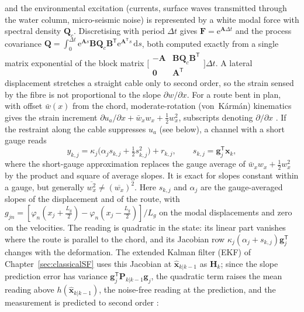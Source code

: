 and the environmental excitation (currents, surface waves transmitted through the water column, micro-seismic noise) is represented by a white modal force with spectral density $\mathbf{Q}_c$. Discretising with period $\Delta t$ gives $\mathbf{F}=\mathrm{e}^{\mathbf{A}\Delta t}$ and the process covariance $\mathbf{Q}=\int_0^{\Delta t}\mathrm{e}^{\mathbf{A}s}\mathbf{B}\mathbf{Q}_c\mathbf{B}^{\mathsf T}\mathrm{e}^{\mathbf{A}^{\mathsf T}s}\,\mathrm{d}s$, both computed exactly from a single matrix exponential of the block matrix $\bigl[\begin{smallmatrix}-\mathbf{A} & \mathbf{B}\mathbf{Q}_c\mathbf{B}^{\mathsf T}\\ \mathbf{0} & \mathbf{A}^{\mathsf T}\end{smallmatrix}\bigr]\Delta t$. 
A lateral displacement stretches a straight cable only to second order, so the strain sensed by the fibre is not proportional to the slope $\partial w/\partial x$. For a route bent in plan, with offset $\bar w(x)$ from the chord, moderate-rotation (von~K\'arm\'an) kinematics gives the strain increment $\partial u_a/\partial x+\bar w_x w_x+\tfrac12 w_x^{2}$, subscripts denoting $\partial/\partial x$ \cite{irvine_linear_1974,rega_cables_2004}. If the restraint along the cable suppresses $u_a$ (see below), a channel with a short gauge reads
\begin{equation}
y_{k,j}=\kappa_j\bigl(\alpha_j s_{k,j}+\tfrac12 s_{k,j}^{2}\bigr)+r_{k,j},
\qquad
s_{k,j}=\mathbf{g}_j^{\mathsf T}\mathbf{x}_k,
\label{eq:ch07-strain-channel}
\end{equation}
where the short-gauge approximation replaces the gauge average of $\bar w_x w_x+\tfrac12w_x^2$ by the product and square of average slopes. It is exact for slopes constant within a gauge, but generally $\overline{w_x^2}\ne(\overline{w_x})^2$. Here $s_{k,j}$ and $\alpha_j$ are the gauge-averaged slopes of the displacement and of the route, with $g_{jn}=[\varphi_n(x_j+\tfrac{L_g}{2})-\varphi_n(x_j-\tfrac{L_g}{2})]/L_g$ on the modal displacements and zero on the velocities. The reading is quadratic in the state: its linear part vanishes where the route is parallel to the chord, and its Jacobian row $\kappa_j(\alpha_j+s_{k,j})\mathbf{g}_j^{\mathsf T}$ changes with the deformation. The extended Kalman filter (EKF) of Chapter~\ref{sec:classicalSF} uses this Jacobian at $\widehat{\mathbf{x}}_{k|k-1}$ as $\mathbf{H}_k$; since the slope prediction error has variance $\mathbf{g}_j^{\mathsf T}\mathbf{P}_{k|k-1}\mathbf{g}_j$, the quadratic term raises the mean reading above $h(\widehat{\mathbf{x}}_{k|k-1})$, the noise-free reading at the prediction, and the measurement is predicted to second order \cite{jazwinski_1970}:
